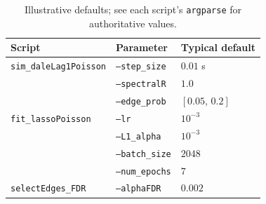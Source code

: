 \documentclass[11pt]{article}
\begin{document}
\begin{table}[h]
\centering
\begin{tabular}{lll}
\toprule
Script & Parameter & Typical default \\
\midrule
\texttt{sim\_daleLag1Poisson} & \texttt{--step\_size} & $0.01$ s \\
 & \texttt{--spectralR} & $1.0$ \\
 & \texttt{--edge\_prob} & $[0.05,\,0.2]$ \\
\texttt{fit\_lassoPoisson} & \texttt{--lr} & $10^{-3}$ \\
 & \texttt{--L1\_alpha} & $10^{-3}$ \\
 & \texttt{--batch\_size} & $2048$ \\
 & \texttt{--num\_epochs} & $7$ \\
\texttt{selectEdges\_FDR} & \texttt{--alphaFDR} & $0.002$ \\
\bottomrule
\end{tabular}
\caption{Illustrative defaults; see each script's \texttt{argparse} for authoritative values.}
\end{table}
\end{document}
